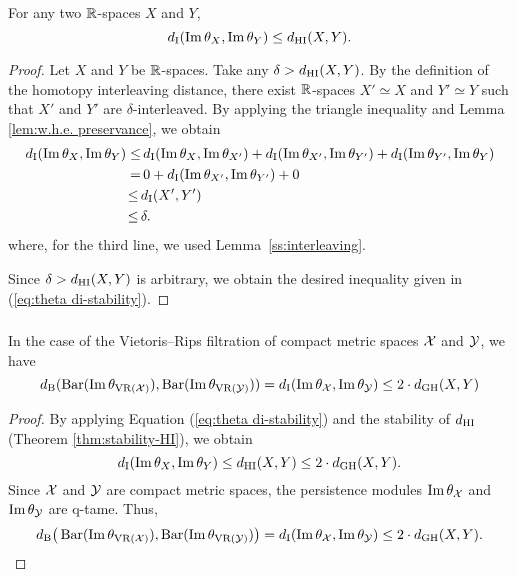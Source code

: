 \subsubsection{}\label{thm:theta stability}
\theorem For any two $\mathbb{R}$-spaces $X$ and $Y$,
\begin{equation}\label{eq:theta di-stability}
	d_{\mathrm{I}}(\operatorname{Im}\theta_{X}, \operatorname{Im}\theta_{Y}) \leq d_{\mathrm{HI}}(X,Y).
\end{equation}

\begin{proof}
	Let $X$ and $Y$ be $\mathbb{R}$-spaces. 
	Take any $\delta > d_{\mathrm{HI}}(X,Y)$.
	By the definition of the homotopy interleaving distance, there exist $\mathbb{R}$-spaces $X' \simeq X$ and $Y' \simeq Y$ such that $X'$ and $Y'$ are $\delta$-interleaved.
	By applying the triangle inequality and Lemma \ref{lem:w.h.e. preservance}, we obtain
	\begin{align*}
		d_{\mathrm{I}}(\operatorname{Im}\theta_{X}, \operatorname{Im}\theta_{Y}) \leq& \,
		d_{\mathrm{I}}(\operatorname{Im}\theta_{X}, \operatorname{Im}\theta_{X'}) + d_{\mathrm{I}}(\operatorname{Im}\theta_{X'}, \operatorname{Im}\theta_{Y'}) + d_{\mathrm{I}}(\operatorname{Im}\theta_{Y'}, \operatorname{Im}\theta_{Y}) \\ =& \, 
		0 + d_{\mathrm{I}}(\operatorname{Im}\theta_{X'}, \operatorname{Im}\theta_{Y'}) + 0 \\ \leq \,&
		d_{\mathrm{I}}(X',Y') \\ \leq \,&
		\delta.
	\end{align*}
	where, for the third line, we used Lemma~\ref{ss:interleaving}.
	
	Since $\delta > d_{\mathrm{HI}}(X,Y)$ is arbitrary, we obtain the desired inequality given in (\ref{eq:theta di-stability}).
\end{proof}

\subsubsection{}\label{cor:theta stability VR}
\corollary
In the case of the Vietoris--Rips filtration of compact metric spaces $\mathcal{X}$ and $\mathcal{Y}$, we have
\[
d_{\mathrm{B}}(\operatorname{Bar}(\operatorname{Im} \theta_{\operatorname{VR}(\mathcal{X})}), \operatorname{Bar}(\operatorname{Im} \theta_{\operatorname{VR}(\mathcal{Y})})) = d_{\mathrm{I}}(\operatorname{Im}\theta_{\mathcal{X}}, \operatorname{Im}\theta_{\mathcal{Y}}) \leq 2 \cdot d_{\mathrm{GH}}(X,Y)
\]

\begin{proof}
        By applying Equation (\ref{eq:theta di-stability}) and the stability of $d_{\mathrm{HI}}$ (Theorem \ref{thm:stability-HI}), we obtain
        \[
        d_{\mathrm{I}}(\operatorname{Im}\theta_{X}, \operatorname{Im}\theta_{Y}) \leq
        d_{\mathrm{HI}}(X,Y)\leq 2\cdot d_{\mathrm{GH}}(X,Y).
        \]
        Since $\mathcal{X}$ and $\mathcal{Y}$ are compact metric spaces, the persistence modules $\operatorname{Im}\theta_{\mathcal{X}}$ and $\operatorname{Im}\theta_{\mathcal{Y}}$ are q-tame.
        Thus,
        \[
        d_{\mathrm{B}}\big(\operatorname{Bar}(\operatorname{Im} \theta_{\operatorname{VR}(\mathcal{X})}), \operatorname{Bar}(\operatorname{Im} \theta_{\operatorname{VR}(\mathcal{Y})})\big) =
        d_{\mathrm{I}}(\operatorname{Im}\theta_{\mathcal{X}}, \operatorname{Im}\theta_{\mathcal{Y}})\leq 2\cdot d_{\mathrm{GH}}(X,Y).
        \]
\end{proof}

